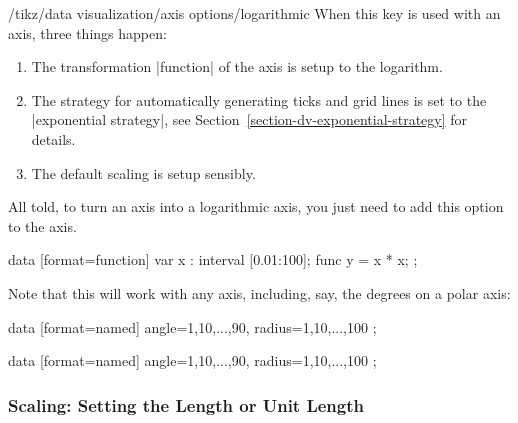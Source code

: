 \begin{key}{/tikz/data visualization/axis options/logarithmic}
    When this key is used with an axis, three things happen:
    \begin{enumerate}
        \item The transformation |function| of the axis is setup to the
            logarithm.
        \item The strategy for automatically generating ticks and grid lines is
            set to the |exponential strategy|, see
            Section~\ref{section-dv-exponential-strategy} for details.
        \item The default scaling is setup sensibly.
    \end{enumerate}
    All told, to turn an axis into a logarithmic axis, you just need to add
    this option to the axis.
\begin{codeexample}[
    width=8cm,
    preamble={\usetikzlibrary{datavisualization.formats.functions}},
]
\tikz \datavisualization [scientific axes,
                          x axis={logarithmic},
                          y axis={logarithmic},
                          visualize as line]
 data [format=function] {
   var x : interval [0.01:100];
   func y = \value x * \value x;
 };
\end{codeexample}
    Note that this will work with any axis, including, say, the degrees on a
    polar axis:
\begin{codeexample}[preamble={\usetikzlibrary{datavisualization.polar}}]
\tikz \datavisualization
    [new polar axes,
     angle axis={logarithmic, scaling=1 at 0 and 90 at 90},
     radius axis={scaling=0 at 0cm and 100 at 3cm},
     visualize as scatter]
  data [format=named] {
    angle={1,10,...,90}, radius={1,10,...,100}
  };
\end{codeexample}
\begin{codeexample}[preamble={\usetikzlibrary{datavisualization.polar}}]
\tikz \datavisualization
    [new polar axes,
     angle axis={degrees},
     radius axis={logarithmic, scaling=1 at 0cm and 100 at 3cm},
     visualize as scatter]
  data [format=named] {
    angle={1,10,...,90}, radius={1,10,...,100}
  };
\end{codeexample}
\end{key}


\subsubsection{Scaling: Setting the Length or Unit Length}

